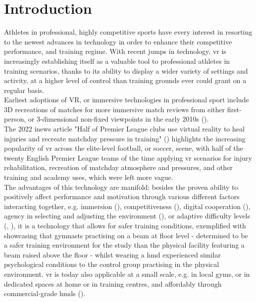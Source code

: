 \chapter{Introduction}
\label{chap::intro-1}

Athletes in professional, highly competitive sports have every interest in resorting to the newest advances in technology in order to enhance their competitive performance, and training regime. With recent jumps in technology, \gls{vr} is increasingly establishing itself as a valuable tool to professional athletes in training scenarios, thanks to its ability to display a wider variety of settings and activity, at a higher level of control than training grounds ever could grant on a regular basis.\\

Earliest adoptions of VR, or immersive technologies in professional sport include 3D recreations of matches for more immersive match reviews from either first-person, or 3-dimensional non-fixed viewpoints in the early 2010s (\cite{farley-2020-virtual}).\\
The 2022 inews article "Half of Premier League clubs use virtual reality to heal injuries and recreate matchday pressure in training" (\cite{cunningham-2022-half}) highlights the increasing popularity of \gls{vr} across the elite-level football, or soccer, scene, with half of the twenty English Premier League teams  of the time applying \gls{vr} scenarios for injury rehabilitation, recreation of matchday atmosphere and pressures, and other training and academy uses, which were left more vague.\\
The advantages of this technology are manifold: besides the proven ability to positively affect performance and motivation through various different factors interacting together, e.g. immersion (\cite{ijsselsteijn-2004-fun}), competitiveness (\cite{nunes-2014-motivating}), digital cooperation (\cite{irwin-2012-aerobic}), agency in selecting and adjusting the environment (\cite{neumann-2018-systematic}), or adaptive difficulty levels (\cite{gray-2017-transfer}, \cite{richlan-2023-virtual}), it is a technology that allows for safer training conditions, exemplified with \cite{ritter-2023-gymnastic} showcasing that gymnasts practising on a beam at floor level - determined to be a safer training environment for the study than the physical facility featuring a beam raised above the floor - whilst wearing a \gls{hmd} experienced similar psychological conditions to the control group practising in the physical environment. \gls{vr} is today also applicable at a small scale, e.g. in local gyms, or in dedicated spaces at home or in training centres, and affordably through commercial-grade \glspl{hmd} (\cite{farley-2020-virtual}).\\

